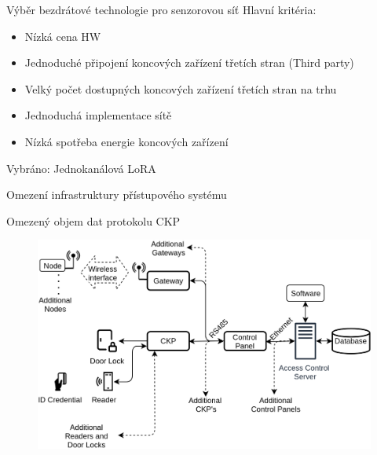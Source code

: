 \documentclass{beamer}
\begin{document}
\begin{frame}{Výběr bezdrátové technologie pro senzorovou síť}
	Hlavní kritéria:
	\begin{itemize}
		\item Nízká cena HW
		\item Jednoduché připojení koncových zařízení třetích stran (Third party)
		\item Velký počet dostupných koncových zařízení třetích stran na trhu 
		\item Jednoduchá implementace sítě
		\item Nízká spotřeba energie koncových zařízení
	\end{itemize}

	Vybráno: Jednokanálová LoRA

\end{frame}




\begin{frame}{Omezení infrastruktury přístupového systému}

	Omezený objem dat protokolu CKP

	\begin{figure}[h]
		\centering
		\includegraphics[width=1\textwidth]{ACS_IoT_extension_21}
		\label{fig:ACS architecture IMA with geteway}
	\end{figure}
		
\end{frame}
\end{document}
